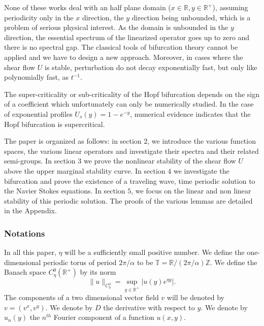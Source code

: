 \documentclass[11pt]{article}
\begin{document}
None of these works deal with an half plane domain ($x\in \mathbb{R},y\in \mathbb{R}^+$),
 assuming periodicity only in the $x$ direction, the $y$ direction being unbounded,
which is a problem of serious physical interest. 
 As the domain is unbounded in the $y$ direction, the essential spectrum of the linearized operator
goes up to zero and there is no spectral gap. The classical tools of bifurcation theory cannot
be applied and we have to design a new approach.
Moreover, in cases where the shear flow $U$ is stable, perturbation do not decay exponentially
fast, but only like polynomially fast, as $t^{-1}$.


\medskip

The super-criticality or sub-criticality of the Hopf bifurcation depends on the sign of a coefficient
which unfortunately can only be numerically studied. In the case of exponential profiles
$U_s(y) = 1 - e^{-y}$, numerical evidence \cite{BG5} indicates that the Hopf bifurcation is supercritical.

\medskip

The paper is organized as follows: in section $2$, we introduce the various function spaces, the
various linear operators and investigate their spectra and their related semi-groups.
In section $3$ we prove the nonlinear stability of the shear flow $U$ above the upper marginal stability curve.
In section $4$ we investigate the bifurcation and prove the existence of a traveling wave, time periodic solution to the
Navier Stokes equations. In section $5$, we focus on the linear and non linear stability of this
periodic solution.
The proofs of the various lemmas are detailed in the Appendix.


 

\subsubsection*{Notations}







In all this paper, $\eta$ will be a sufficiently small positive number.
We define the one-dimensional periodic torus of period $2 \pi / \alpha$ to be $\mathbb{T} = \mathbb{R} / (2 \pi / \alpha) \mathbb{Z}$.
We define the Banach space $C^0_\eta(\mathbb{R}^+)$ by its norm
$$
\|u\|_{C_{\eta}^{0}} = \underset{y\in \mathbb{R}^{+}}{\sup }|u(y) e^{\eta y}|.
$$
The components of a two dimensional vector field $v$ will be denoted by $v = (v^x,v^y)$.
We denote by $D$ the derivative with respect to $y$.
We denote by $u_n(y)$ the $n^{th}$ Fourier component of a function $u(x,y)$.
\end{document}
